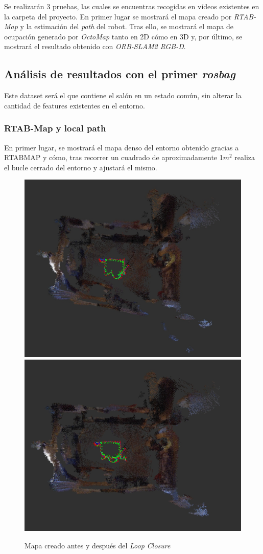 Se realizarán 3 pruebas, las cuales se encuentras recogidas en vídeos existentes en la carpeta del proyecto. En primer lugar se mostrará el mapa creado por \textit{RTAB-Map} y
la estimación del \textit{path} del robot. Tras ello, se mostrará el mapa de ocupación generado por \textit{OctoMap} tanto en 2D cómo en 3D y, por último, se mostrará el
resultado obtenido con \textit{ORB-SLAM2 RGB-D}.
\newpage

\subsection{Análisis de resultados con el primer \textit{rosbag}}
Este dataset será el que contiene el salón en un estado común, sin alterar la cantidad de features existentes en el entorno.

\subsubsection{RTAB-Map y local path}
En primer lugar, se mostrará el mapa denso del entorno obtenido gracias a RTABMAP y cómo, tras recorrer un cuadrado de aproximadamente 1$m^2$ realiza el bucle cerrado del entorno
y ajustará el mismo.
\begin{figure}[h!]
    \centering
    \includegraphics[width=.4\textwidth]{images/slam/bag1_rtabmap_noLC}
    \includegraphics[width=.415\textwidth]{images/slam/bag1_rtabmap_LC}
    \caption{Mapa creado antes y después del \textit{Loop Closure}}
\end{figure}

